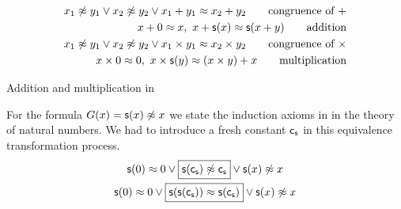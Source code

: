 \begin{table}[hbt]
	\begin{align*}
		x_1\not\approx y_1\lor x_2\not\approx y_2\lor x_1+y_1 \approx x_2+y_2
		\tag*{congruence of $+$}
		\\
		x + 0 \approx x,\
		x+\mathsf{s}(x) \approx \mathsf{s}(x+y)
		\tag*{addition}
		\\
		x_1\not\approx y_1\lor x_2\not\approx y_2\lor x_1\times y_1 \approx x_2\times y_2
		\tag*{congruence of $\times$}
		\\
		x \times 0 \approx 0,\
		x \times\mathsf{s}(y) \approx (x\times y) + x
		\tag*{multiplication}
	\end{align*}
	\caption{Addition and multiplication in \CNF}
	\label{tab:addition:multiplication}
\end{table}

\begin{example} For the formula $G(x)=\mathsf{s}(x)\not\approx x$ we state the induction axioms in \CNF in the theory of natural numbers.
	We had to introduce a fresh constant $\mathsf{c}_{\mathsf{s}}$ in this equivalence transformation process.
	\begin{gather*}
	\mathsf{s}(0)\approx 0 \lor \boxed{\mathsf{s}(\mathsf{c}_{\mathsf{s}})\not\approx \mathsf{c}_{\mathsf{s}}} \lor \mathsf{s}(x)\not\approx x \\
	\mathsf{s}(0)\approx 0 \lor \boxed{\mathsf{s}(\mathsf{s}(\mathsf{c}_{\mathsf{s}}))\approx \mathsf{s}(\mathsf{c}_{\mathsf{s}})} \lor \mathsf{s}(x)\not\approx x
	\end{gather*}
\end{example}


